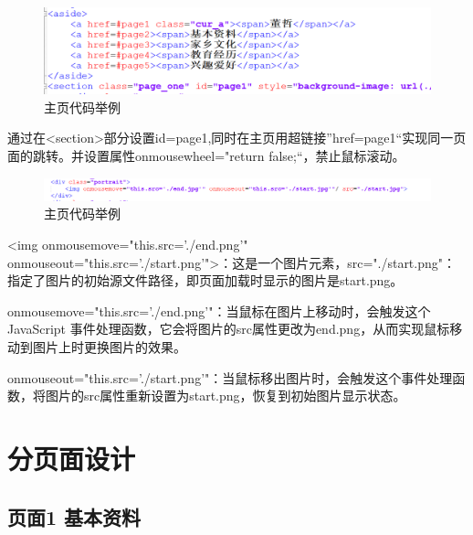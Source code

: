 \documentclass[supercite]{Experimental_Report}
\theoremstyle{definition}
\begin{document}
\begin{figure}[htb]
	\begin{center}
		\includegraphics[scale=0.40]{images/2-1.png}
		\caption{主页代码举例}
		\label{fig2-1}
	\end{center}
\end{figure}

通过在<section>部分设置id=page1,同时在主页用超链接”href=page1“实现同一页面的跳转。并设置属性onmousewheel="return false;“，禁止鼠标滚动。

\begin{figure}[htb]
	\begin{center}
		\includegraphics[scale=0.40]{images/2-2.png}
		\caption{主页代码举例}
		\label{fig2-2}
	\end{center}
\end{figure}

<img onmousemove="this.src='./end.png'" onmouseout="this.src='./start.png'">：这是一个图片元素，src="./start.png"：指定了图片的初始源文件路径，即页面加载时显示的图片是start.png。

onmousemove="this.src='./end.png'"：当鼠标在图片上移动时，会触发这个 JavaScript 事件处理函数，它会将图片的src属性更改为end.png，从而实现鼠标移动到图片上时更换图片的效果。

onmouseout="this.src='./start.png'"：当鼠标移出图片时，会触发这个事件处理函数，将图片的src属性重新设置为start.png，恢复到初始图片显示状态。



\newpage

\section{分页面设计}

\subsection{页面1 基本资料}
\end{document}
